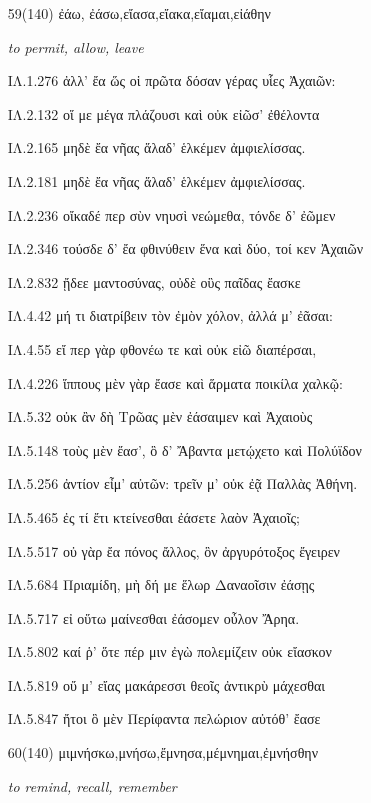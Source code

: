 \begin{enumerate}
{}

\clearpage
\item[\large 59(140)]{\large \g ἐάω, ἐάσω,εἴασα,εἴακα,εἴαμαι,εἰάθην	}

\hspace{0.2cm} \textit{ to permit, allow, leave }

{\g
ΙΛ.1.276 ἀλλ' ἔα ὥς οἱ πρῶτα δόσαν γέρας υἷες Ἀχαιῶν: 

ΙΛ.2.132 οἵ με μέγα πλάζουσι καὶ οὐκ εἰῶσ' ἐθέλοντα 

ΙΛ.2.165 μηδὲ ἔα νῆας ἅλαδ' ἑλκέμεν ἀμφιελίσσας. 

ΙΛ.2.181 μηδὲ ἔα νῆας ἅλαδ' ἑλκέμεν ἀμφιελίσσας. 

ΙΛ.2.236 οἴκαδέ περ σὺν νηυσὶ νεώμεθα, τόνδε δ' ἐῶμεν 

ΙΛ.2.346 τούσδε δ' ἔα φθινύθειν ἕνα καὶ δύο, τοί κεν Ἀχαιῶν 

ΙΛ.2.832 ᾔδεε μαντοσύνας, οὐδὲ οὓς παῖδας ἔασκε 

ΙΛ.4.42 μή τι διατρίβειν τὸν ἐμὸν χόλον, ἀλλά μ' ἐᾶσαι: 

ΙΛ.4.55 εἴ περ γὰρ φθονέω τε καὶ οὐκ εἰῶ διαπέρσαι, 

ΙΛ.4.226 ἵππους μὲν γὰρ ἔασε καὶ ἅρματα ποικίλα χαλκῷ: 

ΙΛ.5.32 οὐκ ἂν δὴ Τρῶας μὲν ἐάσαιμεν καὶ Ἀχαιοὺς 

ΙΛ.5.148 τοὺς μὲν ἔασ', ὃ δ' Ἄβαντα μετῴχετο καὶ Πολύϊδον 

ΙΛ.5.256 ἀντίον εἶμ' αὐτῶν: τρεῖν μ' οὐκ ἐᾷ Παλλὰς Ἀθήνη. 

ΙΛ.5.465 ἐς τί ἔτι κτείνεσθαι ἐάσετε λαὸν Ἀχαιοῖς; 

ΙΛ.5.517 οὐ γὰρ ἔα πόνος ἄλλος, ὃν ἀργυρότοξος ἔγειρεν 

ΙΛ.5.684 Πριαμίδη, μὴ δή με ἕλωρ Δαναοῖσιν ἐάσῃς 

ΙΛ.5.717 εἰ οὕτω μαίνεσθαι ἐάσομεν οὖλον Ἄρηα. 

ΙΛ.5.802 καί ῥ' ὅτε πέρ μιν ἐγὼ πολεμίζειν οὐκ εἴασκον 

ΙΛ.5.819 οὔ μ' εἴας μακάρεσσι θεοῖς ἀντικρὺ μάχεσθαι 

ΙΛ.5.847 ἤτοι ὃ μὲν Περίφαντα πελώριον αὐτόθ' ἔασε 

}

\clearpage
\item[\large 60(140)]{\large \g μιμνήσκω,μνήσω,ἔμνησα,μέμνημαι,ἐμνήσθην	}

\hspace{0.2cm} \textit{ to remind, recall, remember }


\end{enumerate}
